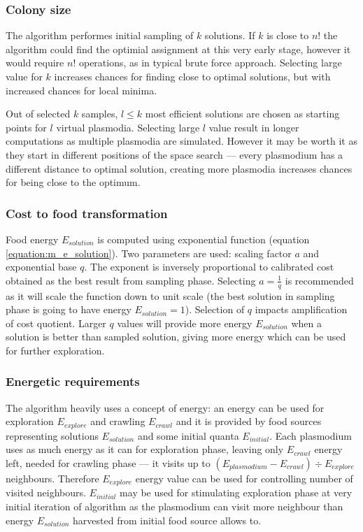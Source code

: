 \subsubsection{Colony size}

The algorithm performes initial sampling of $k$ solutions. If $k$ is close to $n!$ the algorithm could find the optimial assignment at this very early stage, however it would require $n!$ operations, as in typical brute force approach. Selecting large value for $k$ increases chances for finding close to optimal solutions, but with increased chances for local minima.

Out of selected $k$ samples, $l \leq k$ most efficient solutions are chosen as starting points for $l$ virtual plasmodia. Selecting large $l$ value result in longer computations as multiple plasmodia are simulated. However it may be worth it as they start in different positions of the space search --- every plasmodium has a different distance to optimal solution, creating more plasmodia increases chances for being close to the optimum.


\subsubsection{Cost to food transformation}

Food energy $E_{solution}$ is computed using exponential function (equation \ref{equation:m_e_solution}). Two parameters are used: scaling factor $a$ and exponential base $q$. The exponent is inversely proportional to calibrated cost obtained as the best result from sampling phase. Selecting $a = \frac{1}{q}$ is recommended as it will scale the function down to unit scale (the best solution in sampling phase is going to have energy $E_{solution} = 1$). Selection of $q$ impacts amplification of cost quotient. Larger $q$ values will provide more energy $E_{solution}$ when a solution is better than sampled solution, giving more energy which can be used for further exploration.


\subsubsection{Energetic requirements}

The algorithm heavily uses a concept of energy: an energy can be used for exploration $E_{explore}$ and crawling $E_{crawl}$ and it is provided by food sources representing solutions $E_{solution}$ and some initial quanta $E_{initial}$. Each plasmodium uses as much energy as it can for exploration phase, leaving only $E_{crawl}$ energy left, needed for crawling phase --- it visits up to $(E_{plasmodium} - E_{crawl}) \div E_{explore}$ neighbours. Therefore $E_{explore}$ energy value can be used for controlling number of visited neighbours. $E_{initial}$ may be used for stimulating exploration phase at very initial iteration of algorithm as the plasmodium can visit more neighbour than energy $E_{solution}$ harvested from initial food source allows to.

